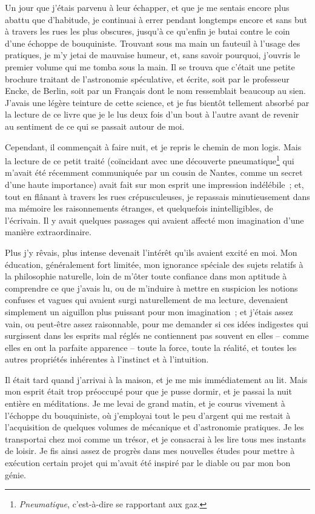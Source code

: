 \documentclass[french,twoside]{book} %
\begin{document}
Un jour que j’étais parvenu à leur échapper, et que je me sentais encore plus abattu que d’habitude, je continuai à errer pendant longtemps encore et sans but à travers les rues les plus obscures, jusqu’à ce qu’enfin je butai contre le coin d’une échoppe de bouquiniste. Trouvant sous ma main un fauteuil à l’usage des pratiques, je m’y jetai de mauvaise humeur, et, sans savoir pourquoi, j’ouvris le premier volume qui me tomba sous la main. Il se trouva que c’était une petite brochure traitant de l’astronomie spéculative, et écrite, soit par le professeur Encke, de Berlin, soit par un Français dont le nom ressemblait beaucoup au sien. J’avais une légère teinture de cette science, et je fus bientôt tellement absorbé par la lecture de ce livre que je le lus deux fois d’un bout à l’autre avant de revenir au sentiment de ce qui se passait autour de moi.\par
Cependant, il commençait à faire nuit, et je repris le chemin de mon logis. Mais la lecture de ce petit traité (coïncidant avec une découverte pneumatique\footnote{\emph{Pneumatique}, c’est-à-dire se rapportant aux gaz.} qui m’avait été récemment communiquée par un cousin de Nantes, comme un secret d’une haute importance) avait fait sur mon esprit une impression indélébile ; et, tout en flânant à travers les rues crépusculeuses, je repassais minutieusement dans ma mémoire les raisonnements étranges, et quelquefois inintelligibles, de l’écrivain. Il y avait quelques passages qui avaient affecté mon imagination d’une manière extraordinaire.\par
Plus j’y rêvais, plus intense devenait l’intérêt qu’ils avaient excité en moi. Mon éducation, généralement fort limitée, mon ignorance spéciale des sujets relatifs à la philosophie naturelle, loin de m’ôter toute confiance dans mon aptitude à comprendre ce que j’avais lu, ou de m’induire à mettre en suspicion les notions confuses et vagues qui avaient surgi naturellement de ma lecture, devenaient simplement un aiguillon plus puissant pour mon imagination ; et j’étais assez vain, ou peut-être assez raisonnable, pour me demander si ces idées indigestes qui surgissent dans les esprits mal réglés ne contiennent pas souvent en elles – comme elles en ont la parfaite apparence – toute la force, toute la réalité, et toutes les autres propriétés inhérentes à l’instinct et à l’intuition.\par
Il était tard quand j’arrivai à la maison, et je me mis immédiatement au lit. Mais mon esprit était trop préoccupé pour que je pusse dormir, et je passai la nuit entière en méditations. Je me levai de grand matin, et je courus vivement à l’échoppe du bouquiniste, où j’employai tout le peu d’argent qui me restait à l’acquisition de quelques volumes de mécanique et d’astronomie pratiques. Je les transportai chez moi comme un trésor, et je consacrai à les lire tous mes instants de loisir. Je fis ainsi assez de progrès dans mes nouvelles études pour mettre à exécution certain projet qui m’avait été inspiré par le diable ou par mon bon génie.\par
\end{document}
